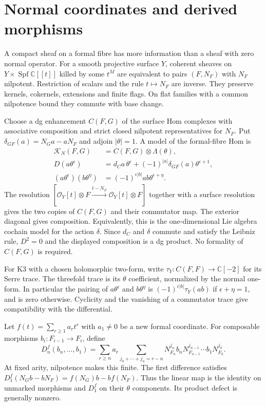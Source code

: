 \section{Normal coordinates and derived morphisms}
\label{cyprim:sec:formal-fibre}

A compact sheaf on a formal fibre has more information
than a sheaf with zero normal operator. For a smooth
projective surface $Y$, coherent sheaves on
$Y\times\operatorname{Spf}\mathbb C[[t]]$ killed by
some $t^M$ are equivalent to pairs $(F,N_F)$ with
$N_F$ nilpotent. Restriction of scalars and the rule
$t\mapsto N_F$ are inverse. They preserve kernels,
cokernels, extensions and finite flags. On flat
families with a common nilpotence bound they commute
with base change.

Choose a dg enhancement $C(F,G)$ of the surface Hom
complexes with associative composition and strict
closed nilpotent representatives for $N_F$.
Put $\delta_{GF}(a)=N_Ga-aN_F$ and adjoin
$|\theta|=1$. A model of the formal-fibre Hom is
\begin{equation}\label{cyprim:eq:normal-Hom}
\begin{split}
 \mathcal K_N(F,G)&=C(F,G)\otimes\Lambda(\theta),\\
 D(a\theta^\epsilon)&=d_Ca\,\theta^\epsilon
       +(-1)^{|a|}\delta_{GF}(a)\theta^{\epsilon+1},\\
 (a\theta^\epsilon)(b\theta^\eta)
       &=(-1)^{\epsilon|b|}ab\theta^{\epsilon+\eta}.
\end{split}
\end{equation}
The resolution $[\mathcal O_Y[t]\otimes F
\xrightarrow{t-N_F}\mathcal O_Y[t]\otimes F]$
together with a surface resolution gives the two copies
of $C(F,G)$ and their commutator
map. The exterior diagonal gives composition.
Equivalently, this is the one-dimensional Lie algebra
cochain model for the action $\delta$. Since $d_C$
and $\delta$ commute and satisfy the Leibniz rule,
$D^2=0$ and the displayed composition is a dg product.
No formality of $C(F,G)$ is required.

For K3 with a chosen holomorphic two-form, write
$\tau_Y:C(F,F)\to\mathbb C[-2]$ for its Serre trace.
The threefold trace is its $\theta$ coefficient,
normalized by the normal one-form.
In particular the pairing of $a\theta^\epsilon$ and
$b\theta^\eta$ is $(-1)^{\epsilon|b|}\tau_Y(ab)$
if $\epsilon+\eta=1$, and is zero otherwise.
Cyclicity and the vanishing of a commutator trace
give compatibility with the differential.

Let $f(t)=\sum_{r\ge1}a_rt^r$ with $a_1\ne0$ be
a new formal coordinate. For composable morphisms
$b_i:F_{i-1}\to F_i$, define
\begin{equation}\label{cyprim:eq:divided-difference}
 D_n^f(b_n,\ldots,b_1)=\sum_{r\ge n}a_r
 \sum_{j_0+\cdots+j_n=r-n}
 N_{F_n}^{j_n}b_nN_{F_{n-1}}^{j_{n-1}}
       \cdots b_1N_{F_0}^{j_0}.
\end{equation}
At fixed arity, nilpotence makes this finite.
The first difference satisfies
$D_1^f(N_Gb-bN_F)=f(N_G)b-bf(N_F)$.
Thus the linear map is the identity on unmarked
morphisms and $D_1^f$ on their $\theta$ components.
Its product defect is generally nonzero.

